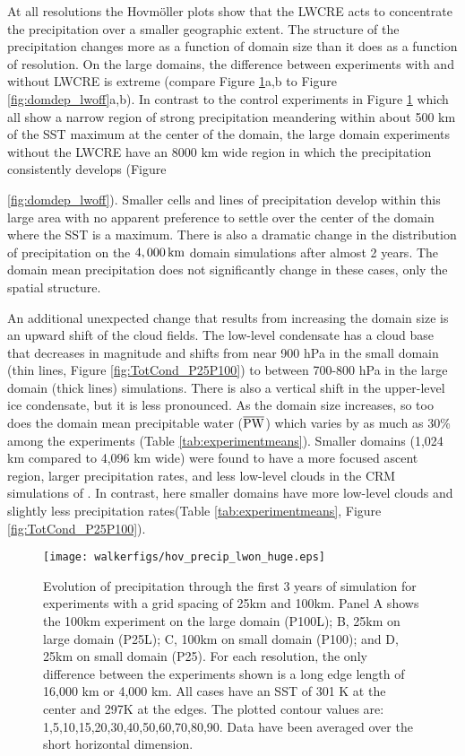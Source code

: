 \documentclass[draft]{agujournal2019}
\begin{document}
At all resolutions the Hovm{\"o}ller plots show that the LWCRE acts to concentrate the precipitation over a smaller geographic extent.   
The structure of the precipitation changes more 
as a function of domain size than it does as a function of resolution. 
On the large domains, the difference between experiments with and without LWCRE is extreme (compare Figure \ref{fig:domdep}a,b to Figure \ref{fig:domdep_lwoff}a,b).  
In contrast to the control experiments in Figure \ref{fig:domdep} which all show a narrow region of strong 
precipitation meandering within about 500 km of the SST maximum at the center of the domain,  the large domain experiments 
without the LWCRE have an 8000 km wide region in which the precipitation consistently develops (Figure {\ref{fig:domdep_lwoff}).  
Smaller cells and lines of precipitation develop within this large area with no apparent preference to settle
over the center of the domain where the SST is a maximum.  
There is also a dramatic change in the distribution of precipitation on the $4,000\, \rm{km}$ domain simulations after almost 2 years.   
The domain mean precipitation does not significantly change in these cases, only the spatial structure. 

An additional unexpected change that results from increasing the domain size is an upward shift of the cloud fields.  
The low-level condensate has a cloud base that decreases in magnitude and shifts from  near 900 hPa in the small domain (thin lines, Figure \ref{fig:TotCond_P25P100}) to between 700-800 hPa in 
the large domain (thick lines) simulations.
There is also a vertical shift in the upper-level ice condensate, but it is less pronounced.  
As the domain size increases, so too does the domain mean precipitable water ($\overline{\rm{PW}}$) which varies by as much as 30\% among the experiments (Table \ref{tab:experimentmeans}).   
Smaller domains (1,024 km compared to 4,096 km wide) were found to have a more focused ascent region, larger precipitation rates, and less low-level clouds in the CRM simulations of .
In contrast, here smaller domains have more low-level clouds and slightly less precipitation rates(Table \ref{tab:experimentmeans}, 
Figure \ref{fig:TotCond_P25P100}).     


\begin{figure}
   \texttt{[image: walkerfigs/hov\_precip\_lwon\_huge.eps]}
  \caption{Evolution of precipitation through the first 3 years of simulation for experiments with a grid spacing of
  25km and 100km.  Panel A shows the 100km experiment on the large domain (P100L); 
  B, 25km on large domain (P25L); C, 100km on small domain (P100); and D, 25km on small domain 
  (P25).  For each resolution, the only difference between the experiments shown is a long edge length of 
  16,000 km or 4,000 km.  All cases have an SST of 301 K at the center and 297K at the edges.  
  The plotted contour values are: 1,5,10,15,20,30,40,50,60,70,80,90.  Data have been averaged over the short horizontal dimension.}
  \label{fig:domdep}
\end{figure}

}
\end{document}
